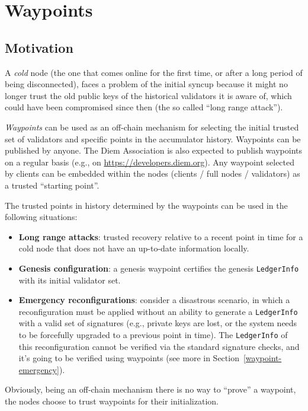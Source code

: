 \documentclass[letterpaper,10pt]{article}
\begin{document}
\section{Waypoints}
\label{waypoints}
\subsection{Motivation}
\label{waypoint-motivation}
A \emph{cold} node (the one that comes online for the first time, or after a long period of being disconnected), faces a problem of the initial syncup because it might no longer trust the old public keys of the historical validators it is aware of, which could have been compromised since then (the so called “long range attack”).

\emph{Waypoints} can be used  as an off-chain mechanism for selecting the initial trusted set of validators and specific points in the accumulator history. Waypoints can be published by anyone. The Diem Association is also expected to publish waypoints on a regular basis (e.g., on \url{https://developers.diem.org}). Any waypoint selected by clients can be embedded within the nodes (clients / full nodes / validators) as a trusted “starting point”.

The trusted points in history determined by the waypoints can be used in the following situations:
\begin{itemize}
\item \textbf{Long range attacks}: trusted recovery relative to a recent point in time for a cold node that does not have an up-to-date information locally.
\item \textbf{Genesis configuration}: a genesis waypoint certifies the genesis \texttt{LedgerInfo} with its initial validator set.
\item \textbf{Emergency reconfigurations}: consider a disastrous scenario, in which a reconfiguration must be applied without an ability to generate a \texttt{LedgerInfo} with a valid set of signatures (e.g., private keys are lost, or the system needs to be forcefully upgraded to a previous point in time). The \texttt{LedgerInfo} of this reconfiguration cannot be verified via the standard signature checks, and it's going to be verified using waypoints (see more in Section~\ref{waypoint-emergency}).
\end{itemize}

Obviously, being an off-chain mechanism there is no way to “prove” a waypoint, the nodes choose to trust waypoints for their initialization.
\end{document}

